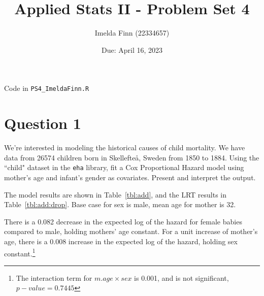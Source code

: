 \documentclass[12pt,letterpaper]{article}
\title{Applied Stats II - Problem Set 4}
\date{Due: April 16, 2023}
\author{Imelda Finn (22334657)}
\begin{document}
	\maketitle

	Code in \texttt{PS4\_ImeldaFinn.R}

\section*{Question 1}
\vspace{.25cm}
\noindent We're interested in modeling the historical causes of child mortality. We have data from 26574 children born in Skellefteå, Sweden from 1850 to 1884. Using the ``child" dataset in the \texttt{eha} library, fit a Cox Proportional Hazard model using mother's age and infant's gender as covariates. Present and interpret the output.

%  
  
The model results are shown in Table~\ref{tbl:add}, and the LRT results in Table~\ref{tbl:add:drop}.  Base case for sex is male, mean age for mother is 32.

There is a 0.082 decrease in the expected log of the hazard for female babies compared to male, holding mothers' age constant. For a unit increase of mother's age, there is a 0.008 increase in the expected log of the hazard, holding sex constant.\footnote{The interaction term for $m.age\times sex$ is 0.001, and is not significant, $p-value =0.7445$}
\end{document}

